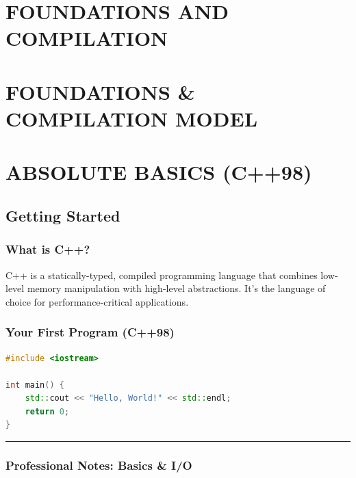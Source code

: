 \hypertarget{foundations-and-compilation}{%
\chapter{FOUNDATIONS AND
COMPILATION}\label{foundations-and-compilation}}

\hypertarget{foundations-compilation-model}{%
\chapter{FOUNDATIONS \& COMPILATION
MODEL}\label{foundations-compilation-model}}

\hypertarget{absolute-basics-c98}{%
\chapter{ABSOLUTE BASICS (C++98)}\label{absolute-basics-c98}}

\hypertarget{getting-started}{%
\section{Getting Started}\label{getting-started}}

\hypertarget{what-is-c}{%
\subsection{What is C++?}\label{what-is-c}}

C++ is a statically-typed, compiled programming language that combines
low-level memory manipulation with high-level abstractions. It's the
language of choice for performance-critical applications.

\hypertarget{your-first-program-c98}{%
\subsection{Your First Program (C++98)}\label{your-first-program-c98}}

\begin{lstlisting}[language={C++}]
#include <iostream>

int main() {
    std::cout << "Hello, World!" << std::endl;
    return 0;
}
\end{lstlisting}

\begin{center}\rule{0.5\linewidth}{0.5pt}\end{center}

\hypertarget{professional-notes-basics-io}{%
\subsection{Professional Notes: Basics \&
I/O}\label{professional-notes-basics-io}}

